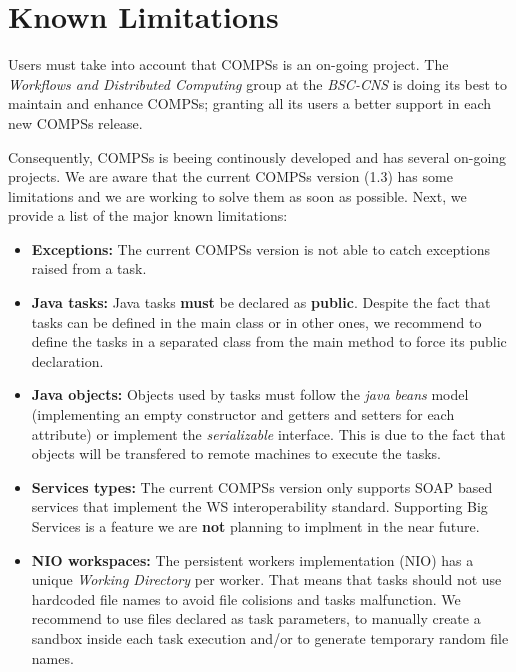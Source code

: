 \section{Known Limitations}
\label{sec:Known_Limitations}

Users must take into account that COMPSs is an on-going project. The \textit{Workflows and Distributed Computing} group 
at the \textit{BSC-CNS} is doing its best to maintain and enhance COMPSs; granting all its users a better support in
each new COMPSs release. 

Consequently, COMPSs is beeing continously developed and has several on-going projects. We are aware that the current COMPSs version
(1.3) has some limitations and we are working to solve them as soon as possible. Next, we provide a list of the major known
limitations: 
\begin{itemize}
 \item \textbf{Exceptions:} \newline The current COMPSs version is not able to catch exceptions raised from a task.
 
 \item \textbf{Java tasks:} \newline Java tasks \textbf{must} be declared as \textbf{public}. Despite the fact that tasks can be
 defined in the main class or in other ones, we recommend to define the tasks in a separated class from the main method to force
 its public declaration.
 
 \item \textbf{Java objects:} \newline Objects used by tasks must follow the \textit{java beans} model (implementing an empty 
 constructor and getters and setters for each attribute) or implement the \textit{serializable} interface. This is due to the 
 fact that objects will be transfered to remote machines to execute the tasks.
 
 \item \textbf{Services types:} \newline The current COMPSs version only supports SOAP based services that implement the WS 
 interoperability standard. Supporting Big Services is a feature we are \textbf{not} planning to implment in the near future.
 
 \item \textbf{NIO workspaces:} \newline The persistent workers implementation (NIO) has a unique \textit{Working Directory} per 
 worker. That means that tasks should not use hardcoded file names to avoid file colisions and tasks malfunction. We recommend to
 use files declared as task parameters, to manually create a sandbox inside each task execution and/or to generate temporary 
 random file names. 
 

\end{itemize}
